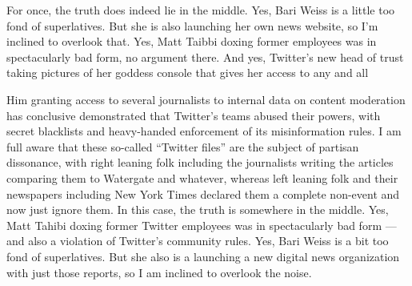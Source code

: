 For once, the truth does
indeed lie in the middle. Yes, Bari Weiss is a little too fond of superlatives.
But she is also launching her own news website, so I'm inclined to overlook
that. Yes, Matt Taibbi doxing former employees was in spectacularly bad form, no
argument there. And yes, Twitter's new head of trust taking pictures of her
goddess console that gives her access to any and all



Him granting access to several journalists to internal data on
content moderation has conclusive demonstrated that Twitter's teams abused their
powers, with secret blacklists and heavy-handed enforcement of its
misinformation rules. I am full aware that these so-called ``Twitter files'' are
the subject of partisan dissonance, with right leaning folk including the
journalists writing the articles comparing them to Watergate and whatever,
whereas left leaning folk and their newspapers including New York Times declared
them a complete non-event and now just ignore them. In this case, the truth is
somewhere in the middle. Yes, Matt Tahibi doxing former Twitter employees was in
spectacularly bad form --- and also a violation of Twitter's community rules.
Yes, Bari Weiss is a bit too fond of superlatives. But she also is a launching a
new digital news organization with just those reports, so I am inclined to
overlook the noise.
